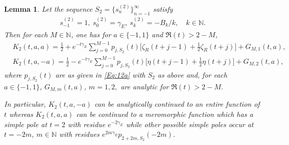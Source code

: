 \documentclass[letterpaper,10pt]{amsart}
\newtheorem{lem}[thm]{Lemma}
\numberwithin{equation}{section}
\begin{document}
\begin{lem}\label{Lem:Spec}
Let the sequence $S_2=\{s_n^{(2)}\}_{n=-1}^\infty$ satisfy
\begin{align}
 s_{-1}^{(2)}=1,\ s_0^{(2)}=\gamma_E,\ s_k^{(2)}=-B_k/k,\quad k\in\mathbb{N}.
\end{align} 
Then for each $M\in\mathbb{N}$, one has for $a\in\{-1,1\}$ and $\Re(t)>2-M$,
\begin{align}
&K_2(t,a,a)=\frac{1}{2}+e^{-t\gamma_E}\sum_{j=0}^{M-1}p_{j,S_2}(t)\bigg[\zeta_R(t+j-1)+\frac{1}{2}\zeta_R(t+j)\bigg]+G_{M,1}(t,a), \label{Eq:Mero}\\
&K_2(t,a,-a)=\frac{1}{2}-e^{-t\gamma_E}\sum_{j=0}^{M-1}p_{j,S_2}(t)\bigg[\eta(t+j-1)+\frac{1}{2}\eta(t+j)\bigg]+G_{M,2}(t,a),\label{Eq:Ent}
\end{align}
where $p_{j,S_2}(t)$ are as given in \eqref{Eq:12a} with $S_2$ as above and, for each $a\in\{-1,1\}$, $G_{M,m}(t,a)$, $m=1,2,$ are analytic for $\Re(t)>2-M$.

In particular, $K_2(t,a,-a)$ can be analytically continued to an entire function of $t$ whereas $K_2(t,a,a)$ can be continued to a meromorphic function which has a simple pole at $t=2$ with residue $e^{-2\gamma_E}$ while other possible simple poles occur at $t=-2m$, $m\in\mathbb{N}$ with residues $e^{2m\gamma_E}p_{2+2m,S_2}(-2m)$.
\end{lem}
\end{document}
